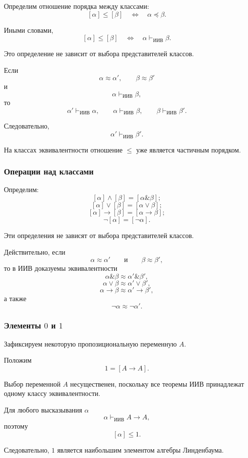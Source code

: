 \documentclass[12pt,a4paper,oneside,openany]{book}
\theoremstyle{definition}
\theoremstyle{plain}
\theoremstyle{remark}
\begin{document}
Определим отношение порядка между классами:
\[
[\alpha]\leq[\beta]
\quad\Longleftrightarrow\quad
\alpha\preccurlyeq\beta.
\]

Иными словами,
\[
[\alpha]\leq[\beta]
\quad\Longleftrightarrow\quad
\alpha\vdash_{\mathrm{ИИВ}}\beta.
\]

Это определение не зависит от выбора представителей классов.

Если
\[
\alpha\approx\alpha',
\qquad
\beta\approx\beta'
\]
и
\[
\alpha\vdash_{\mathrm{ИИВ}}\beta,
\]
то
\[
\alpha'\vdash_{\mathrm{ИИВ}}\alpha,
\qquad
\alpha\vdash_{\mathrm{ИИВ}}\beta,
\qquad
\beta\vdash_{\mathrm{ИИВ}}\beta'.
\]

Следовательно,
\[
\alpha'\vdash_{\mathrm{ИИВ}}\beta'.
\]

На классах эквивалентности отношение \(\leq\) уже является частичным
порядком.

\subsubsection{Операции над классами}

Определим:
\[
[\alpha]\wedge[\beta]
=
[\alpha\mathbin{\&}\beta];
\]
\[
[\alpha]\vee[\beta]
=
[\alpha\lor\beta];
\]
\[
[\alpha]\to[\beta]
=
[\alpha\to\beta];
\]
\[
\neg[\alpha]
=
[\neg\alpha].
\]

Эти определения не зависят от выбора представителей классов.

Действительно, если
\[
\alpha\approx\alpha'
\qquad\text{и}\qquad
\beta\approx\beta',
\]
то в ИИВ доказуемы эквивалентности
\[
\alpha\mathbin{\&}\beta
\approx
\alpha'\mathbin{\&}\beta',
\]
\[
\alpha\lor\beta
\approx
\alpha'\lor\beta',
\]
\[
\alpha\to\beta
\approx
\alpha'\to\beta',
\]
а также
\[
\neg\alpha\approx\neg\alpha'.
\]

\subsubsection{Элементы \(0\) и \(1\)}

Зафиксируем некоторую пропозициональную переменную \(A\).

Положим
\[
1=[A\to A].
\]

Выбор переменной \(A\) несущественен, поскольку все теоремы ИИВ
принадлежат одному классу эквивалентности.

Для любого высказывания \(\alpha\)
\[
\alpha\vdash_{\mathrm{ИИВ}}A\to A,
\]
поэтому
\[
[\alpha]\leq1.
\]

Следовательно, \(1\) является наибольшим элементом алгебры
Линденбаума.
\end{document}
